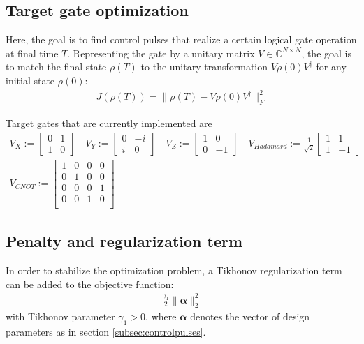\documentclass[letterpaper]{article}
\newcommand{\C}{\mathds{C}}
\begin{document}
\subsection{Target gate optimization}

Here, the goal is to find control pulses that realize a certain logical gate
operation at final time $T$. Representing the gate by a unitary matrix $V\in
\C^{N\times N}$, the goal is to match the final state $\rho(T)$ to the unitary
transformation $V\rho(0)V^{\dagger}$ for any initial state $\rho(0)$:
\begin{align}
  J(\rho(T)) = \| \rho(T) - V\rho(0)V^{\dagger} \|^2_F 
\end{align} 


Target gates that are currently implemented are
\begin{align}
  V_{X} := \begin{bmatrix} 0 & 1 \\ 1 & 0  \end{bmatrix} \quad
  V_{Y} := \begin{bmatrix} 0 & -i \\ i & 0 \end{bmatrix} \quad
  V_{Z} := \begin{bmatrix} 1 & 0 \\ 0 & -1 \end{bmatrix} \quad 
  V_{Hadamard} := \frac{1}{\sqrt{2}} 
           \begin{bmatrix} 1 & 1 \\ 1 & -1 \end{bmatrix} \\
  V_{CNOT} := \begin{bmatrix} 1  & 0 & 0 & 0 \\ 
                               0  & 1 & 0 & 0 \\ 
                               0  & 0 & 0 & 1 \\ 
                               0  & 0 & 1 & 0 \\ 
                \end{bmatrix}
\end{align}

\subsection{Penalty and regularization term}
In order to stabilize the optimization problem, a Tikhonov regularization term can be added to the objective function:
\begin{align}
 \frac{\gamma_1}{2} \| \boldsymbol{\alpha} \|^2_2
\end{align}
with Tikhonov parameter $\gamma_1 > 0$, where $\boldsymbol{\alpha}$ denotes the vector of design parameters as in section \ref{subsec:controlpulses}.
\end{document}
